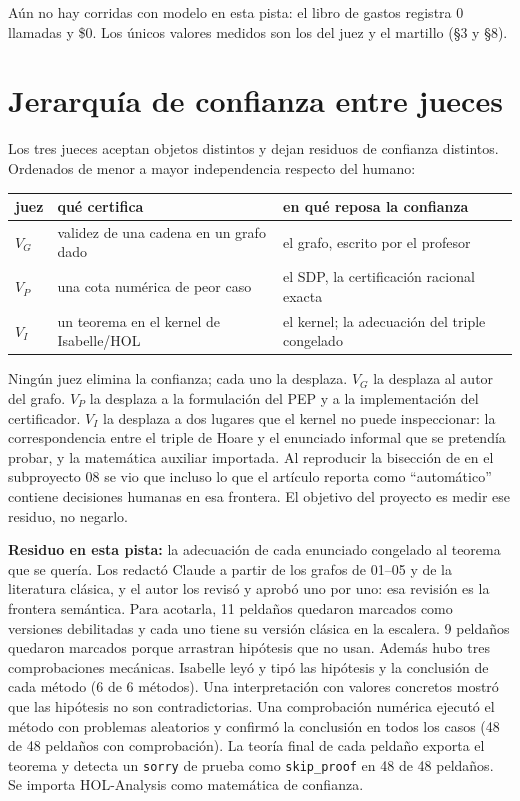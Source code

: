 \documentclass[11pt,a4paper]{article}
\begin{document}
Aún no hay corridas con modelo en esta pista: el libro de gastos registra 0 llamadas y \$0. Los únicos valores medidos son los del juez y el martillo (§3 y §8).

\section{Jerarquía de confianza entre jueces}

Los tres jueces aceptan objetos distintos y dejan residuos de confianza distintos. Ordenados de menor a mayor independencia respecto del humano:

\begin{center}
\begin{tabular}{@{}lll@{}}
\toprule
juez & qué certifica & en qué reposa la confianza \\
\midrule
$V_G$ & validez de una cadena en un grafo dado & el grafo, escrito por el profesor \\
$V_P$ & una cota numérica de peor caso & el SDP, la certificación racional exacta \\
$V_I$ & un teorema en el kernel de Isabelle/HOL & el kernel; la adecuación del triple congelado \\
\bottomrule
\end{tabular}
\end{center}

Ningún juez elimina la confianza; cada uno la desplaza. $V_G$ la desplaza al autor del grafo. $V_P$ la desplaza a la formulación del PEP y a la implementación del certificador. $V_I$ la desplaza a dos lugares que el kernel no puede inspeccionar: la correspondencia entre el triple de Hoare y el enunciado informal que se pretendía probar, y la matemática auxiliar importada. Al reproducir la bisección de \citet{BryantHuertaFoster2026} en el subproyecto 08 se vio que incluso lo que el artículo reporta como ``automático'' contiene decisiones humanas en esa frontera. El objetivo del proyecto es medir ese residuo, no negarlo.

\textbf{Residuo en esta pista:} la adecuación de cada enunciado congelado al teorema que se quería. Los redactó Claude a partir de los grafos de 01--05 y de la literatura clásica, y el autor los revisó y aprobó uno por uno: esa revisión es la frontera semántica. Para acotarla, 11 peldaños quedaron marcados como versiones debilitadas y cada uno tiene su versión clásica en la escalera. 9 peldaños quedaron marcados porque arrastran hipótesis que no usan. Además hubo tres comprobaciones mecánicas. Isabelle leyó y tipó las hipótesis y la conclusión de cada método (6 de 6 métodos). Una interpretación con valores concretos mostró que las hipótesis no son contradictorias. Una comprobación numérica ejecutó el método con problemas aleatorios y confirmó la conclusión en todos los casos (48 de 48 peldaños con comprobación). La teoría final de cada peldaño exporta el teorema y detecta un \texttt{sorry} de prueba como \texttt{skip\_proof} en 48 de 48 peldaños. Se importa HOL-Analysis como matemática de confianza.
\end{document}
